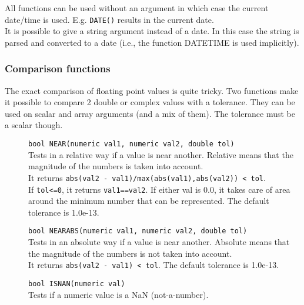 All functions can be used without an argument in which case the current
date/time is used. E.g. \texttt{DATE()} results in the current date.
\\It is possible to give a string argument instead of a date. In this
case the string is parsed and converted to a date (i.e., the
function DATETIME is used implicitly).

\subsubsection{Comparison functions}
The exact comparison of floating point values is quite tricky.
Two functions make it possible to compare 2 double or complex
values with a tolerance.
They can be used on scalar and array arguments (and a mix of them).
The tolerance must be a scalar though.
\begin{description}
  \item[] \texttt{bool NEAR(numeric val1, numeric val2, double tol)}\\
    Tests in a relative way if a value is near another. Relative
    means that the
    magnitude of the numbers is taken into account.
    \\It returns
    \texttt{abs(val2 - val1)/max(abs(val1),abs(val2)) < tol}.
    \\If \texttt{tol<=0}, it returns \texttt{val1==val2}.
    If either val is 0.0, it takes
    care of area around the minimum number that can be represented.
    The default tolerance is 1.0e-13.
  \item[] \texttt{bool NEARABS(numeric val1, numeric val2, double tol)}\\
    Tests in an absolute way if a value is near another. Absolute
    means that the
    magnitude of the numbers is not taken into account.
    \\It returns \texttt{abs(val2 - val1) < tol}.
    The default tolerance is 1.0e-13.
  \item[] \texttt{bool ISNAN(numeric val)}\\
    Tests if a numeric value is a NaN (not-a-number).
\end{description}

